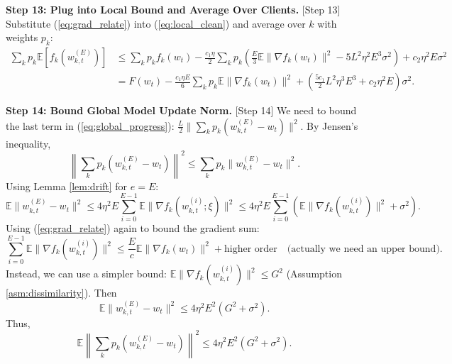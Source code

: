 \documentclass{article}
\begin{document}
\textbf{Step 13: Plug into Local Bound and Average Over Clients.} [Step 13]
Substitute (\ref{eq:grad_relate}) into (\ref{eq:local_clean}) and average over $k$ with weights $p_k$:
\begin{align}
    \sum_k p_k \mathbb{E}[f_k(w_{k,t}^{(E)})] &\leq \sum_k p_k f_k(w_t) - \frac{c_1 \eta}{2} \sum_k p_k \left( \frac{E}{3} \mathbb{E} \| \nabla f_k(w_t) \|^2 - 5 L^2 \eta^2 E^3 \sigma^2 \right) + c_2 \eta^2 E \sigma^2 \\
    &= F(w_t) - \frac{c_1 \eta E}{6} \sum_k p_k \mathbb{E} \| \nabla f_k(w_t) \|^2 + \left( \frac{5 c_1}{2} L^2 \eta^3 E^3 + c_2 \eta^2 E \right) \sigma^2. \label{eq:avg_local}
\end{align}

\textbf{Step 14: Bound Global Model Update Norm.} [Step 14]
We need to bound the last term in (\ref{eq:global_progress}): $\frac{L}{2} \| \sum_k p_k (w_{k,t}^{(E)} - w_t) \|^2$.
By Jensen's inequality,
\begin{equation}
    \left\| \sum_k p_k (w_{k,t}^{(E)} - w_t) \right\|^2 \leq \sum_k p_k \| w_{k,t}^{(E)} - w_t \|^2.
\end{equation}
Using Lemma \ref{lem:drift} for $e=E$:
\begin{equation}
    \mathbb{E} \| w_{k,t}^{(E)} - w_t \|^2 \leq 4 \eta^2 E \sum_{i=0}^{E-1} \mathbb{E} \| \nabla f_k(w_{k,t}^{(i)}; \xi) \|^2 \leq 4 \eta^2 E \sum_{i=0}^{E-1} \left( \mathbb{E} \| \nabla f_k(w_{k,t}^{(i)}) \|^2 + \sigma^2 \right).
\end{equation}
Using (\ref{eq:grad_relate}) again to bound the gradient sum:
\begin{equation}
    \sum_{i=0}^{E-1} \mathbb{E} \| \nabla f_k(w_{k,t}^{(i)}) \|^2 \leq \frac{E}{c} \mathbb{E} \| \nabla f_k(w_t) \|^2 + \text{higher order} \quad \text{(actually we need an upper bound)}.
\end{equation}
Instead, we can use a simpler bound: $\mathbb{E} \| \nabla f_k(w_{k,t}^{(i)}) \|^2 \leq G^2$ (Assumption \ref{asm:dissimilarity}). Then
\begin{equation}
    \mathbb{E} \| w_{k,t}^{(E)} - w_t \|^2 \leq 4 \eta^2 E^2 (G^2 + \sigma^2).
\end{equation}
Thus,
\begin{equation}
    \mathbb{E} \left\| \sum_k p_k (w_{k,t}^{(E)} - w_t) \right\|^2 \leq 4 \eta^2 E^2 (G^2 + \sigma^2). \label{eq:update_norm}
\end{equation}
\end{document}
